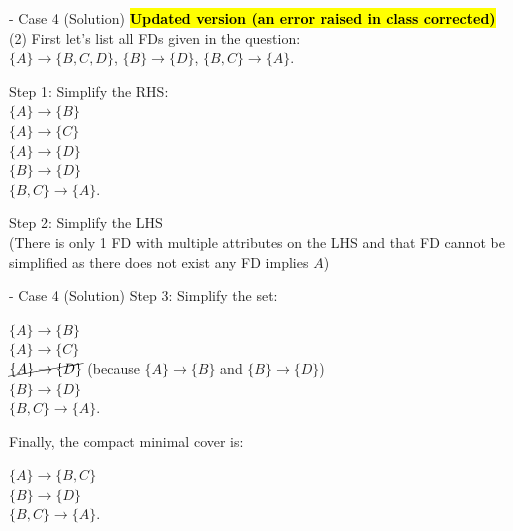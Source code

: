 \begin{frame}[fragile]{ - Case 4 (Solution)}
	\textcolor{red}{\textbf{\hl{Updated version (an error raised in class corrected)}}}\\
	(2) First let's list all FDs given in the question:\\\vspace{5pt}
	$\{A\} \rightarrow \{B,C,D\}$, 
	$\{B\} \rightarrow \{D\}$, 
	$\{B, C\} \rightarrow \{A\}$.\\\vspace{5pt}
	
	Step 1: Simplify the RHS:\\\vspace{5pt}
	$\{A\} \rightarrow \{B\}$\\
	$\{A\} \rightarrow \{C\}$\\
	$\{A\} \rightarrow \{D\}$\\
	$\{B\} \rightarrow \{D\}$\\
	$\{B, C\} \rightarrow \{A\}$.\\\vspace{5pt}
	
	Step 2: Simplify the LHS \\
	(There is only 1 FD with multiple attributes on the LHS and that FD cannot be simplified as there does not exist any FD implies $A$) \\\vspace{5pt}
	
\end{frame}

\begin{frame}[fragile]{ - Case 4 (Solution)}
	Step 3: Simplify the set:\\\vspace{5pt}
	
	$\{A\} \rightarrow \{B\}$\\
	$\{A\} \rightarrow \{C\}$\\
	$\cancel{\{A\} \rightarrow \{D\}}$ (because $\{A\} \rightarrow \{B\}$ and $\{B\} \rightarrow \{D\}$)\\
	$\{B\} \rightarrow \{D\}$\\
	$\{B, C\} \rightarrow \{A\}$.\\\vspace{5pt}
	
	Finally, the compact minimal cover is:\\\vspace{5pt}
	
	$\{A\} \rightarrow \{B, C\}$\\
	$\{B\} \rightarrow \{D\}$\\
	$\{B, C\} \rightarrow \{A\}$.\\\vspace{5pt}
	
\end{frame}

